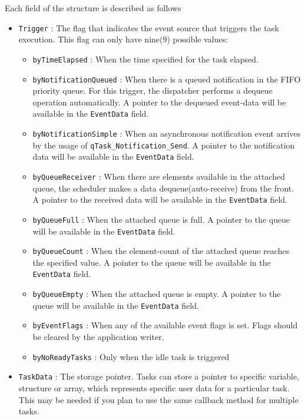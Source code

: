 \documentclass{article}
\begin{document}
Each field of the structure is described as follows
\begin{itemize}
    \item \lstinline{Trigger} : The flag that indicates the event source that triggers the task execution. This flag can only have nine(9) possible values:
    \begin{itemize}
        \item \lstinline{byTimeElapsed}  : When the time specified for the task elapsed.
        \item \lstinline{byNotificationQueued} : When there is a queued notification in the FIFO priority queue. For this trigger, the dispatcher performs a dequeue operation automatically. A pointer to the dequeued event-data will be available in the \lstinline{EventData}  field.
        \item \lstinline{byNotificationSimple} : When an asynchronous notification event  arrives by the usage of \lstinline{qTask_Notification_Send}. A pointer to the notification data will be available in the \lstinline{EventData} field.
        \item \lstinline{byQueueReceiver} : When there are elements available in the attached queue, the scheduler makes a data dequeue(auto-receive) from the front. A pointer to the received data will be available in the \lstinline{EventData} field.
        \item \lstinline{byQueueFull} : When the attached queue is full. A pointer to the queue will be available in the \lstinline{EventData} field.
        \item \lstinline{byQueueCount} : When the element-count of the  attached queue reaches
        the specified value. A pointer to the queue will be available in the \lstinline{EventData} field.
        \item \lstinline{byQueueEmpty} : When the attached queue is empty. A pointer to the queue will be available in the \lstinline{EventData} field.
        \item \lstinline{byEventFlags} : When any of the available event flags is set. Flags should be cleared by the application writer.
        \item \lstinline{byNoReadyTasks} : Only when the idle task is triggered
    \end{itemize}
    \item \lstinline{TaskData} : The storage pointer. Tasks can store a pointer to specific variable, structure or array, which represents specific user data for a particular task. This may be needed if you plan to use the same callback method for multiple tasks.

\end{itemize}
\end{document}
